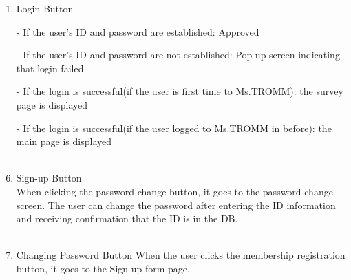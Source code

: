 \documentclass[conference]{IEEEtran}
\begin{document}
\begin{enumerate}
    \item Login Button\\
        \item[-] If the user’s ID and password are established: Approved\\
        \item[-] If the user’s ID and password are not established: Pop-up screen indicating that login failed\\
        \item[-] If the login is successful(if the user is first time to Ms.TROMM): the survey page is displayed\\
        \item[-] If the login is successful(if the user logged to Ms.TROMM in before): the main page is displayed\\ \\
    \item Sign-up Button\\
        When clicking the password change button, it goes to the password change screen. The user can change the password after entering the ID information and receiving confirmation that the ID is in the DB.\\ \\
    \item Changing Password Button
        When the user clicks the membership registration button, it goes to the Sign-up form page. \\ \\
\end{enumerate}
\end{document}
